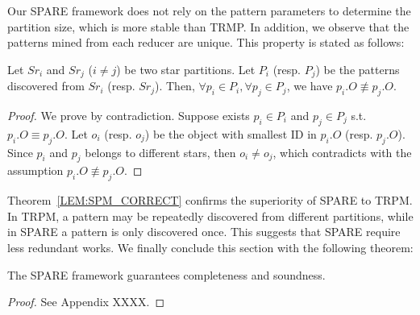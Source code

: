 Our SPARE framework does not rely on the pattern parameters to determine the partition size,
which is more stable than TRMP. In addition, we observe that the patterns mined from each
reducer are unique. This property is stated as follows:
\begin{theorem}
\label{LEM:SPM_CORRECT}
Let $Sr_i$ and $Sr_j$ ($i\neq j$) be two star partitions. Let $P_i$ (resp. $P_j$) be 
the patterns discovered from $Sr_i$ (resp. $Sr_j$). 
Then, $\forall p_i \in P_i, \forall p_j \in P_j$, we have $p_i.O \not\equiv p_j.O$.
\end{theorem}
\begin{proof}
We prove by contradiction. Suppose exists $p_i \in P_i$ and $p_j \in P_j$ s.t. $p_i.O \equiv p_j.O$.
Let $o_i$ (resp. $o_j$) be the object with smallest ID in $p_i.O$ (resp. $p_j.O$).
Since $p_i$ and $p_j$ belongs to different stars, then $o_i \neq o_j$,  which contradicts with
the assumption $p_i.O \not\equiv p_j.O$. 
\end{proof}

Theorem~\ref{LEM:SPM_CORRECT} confirms the superiority of SPARE to TRPM. In TRPM, a pattern
may be repeatedly discovered from different partitions, while in SPARE a pattern is only discovered once. This suggests that SPARE require less redundant works. We finally conclude this section with the following theorem:

\begin{theorem}
\label{THM:SPM_CORRECT}
The SPARE framework guarantees completeness and soundness.
\end{theorem}
\begin{proof}
See Appendix XXXX.
\end{proof}



